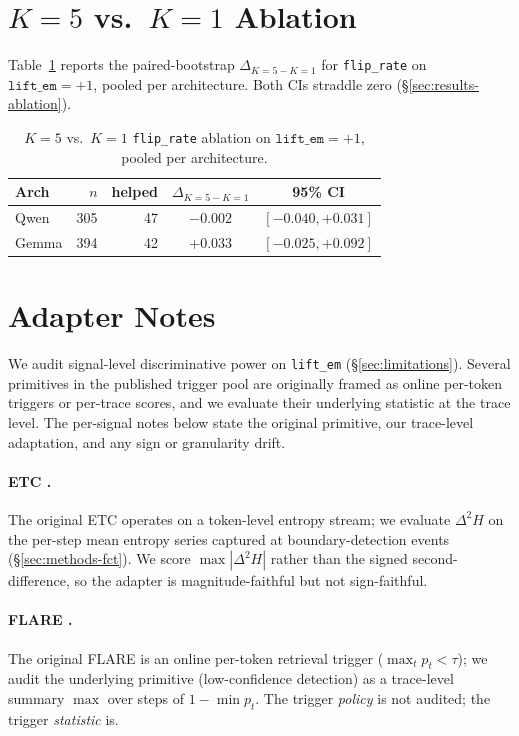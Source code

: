 \documentclass[11pt]{article}
\begin{document}
\section{$K{=}5$ vs.\ $K{=}1$ Ablation}
\label{sec:appendix-k-ablation}

Table~\ref{tab:k-ablation} reports the paired-bootstrap $\Delta_{K{=}5 - K{=}1}$ for \texttt{flip\_rate} on $\texttt{lift\_em}{=}+1$, pooled per architecture. Both CIs straddle zero (\S\ref{sec:results-ablation}).

\begin{table}[h]
\centering\small
\begin{tabular}{@{}lrrcc@{}}
\toprule
\textbf{Arch} & $n$ & \textbf{helped} & $\Delta_{K{=}5 - K{=}1}$ & \textbf{95\% CI} \\
\midrule
Qwen  & 305 & 47 & $-0.002$ & $[-0.040, +0.031]$ \\
Gemma & 394 & 42 & $+0.033$ & $[-0.025, +0.092]$ \\
\bottomrule
\end{tabular}
\caption{$K{=}5$ vs.\ $K{=}1$ \texttt{flip\_rate} ablation on $\texttt{lift\_em}{=}+1$, pooled per architecture.}
\label{tab:k-ablation}
\end{table}

\section{Adapter Notes}
\label{sec:appendix-adapters}

We audit signal-level discriminative power on \texttt{lift\_em} (\S\ref{sec:limitations}). Several primitives in the published trigger pool are originally framed as online per-token triggers or per-trace scores, and we evaluate their underlying statistic at the trace level. The per-signal notes below state the original primitive, our trace-level adaptation, and any sign or granularity drift.

\paragraph{ETC \citep{li_modeling_2026}.} The original ETC operates on a token-level entropy stream; we evaluate $\Delta^2 H$ on the per-step mean entropy series captured at boundary-detection events (\S\ref{sec:methods-fct}). We score $\max |\Delta^2 H|$ rather than the signed second-difference, so the adapter is magnitude-faithful but not sign-faithful.

\paragraph{FLARE \citep{jiang_active_2023}.} The original FLARE is an online per-token retrieval trigger ($\max_t p_t < \tau$); we audit the underlying primitive (low-confidence detection) as a trace-level summary $\max$ over steps of $1 - \min p_t$. The trigger \emph{policy} is not audited; the trigger \emph{statistic} is.
\end{document}

